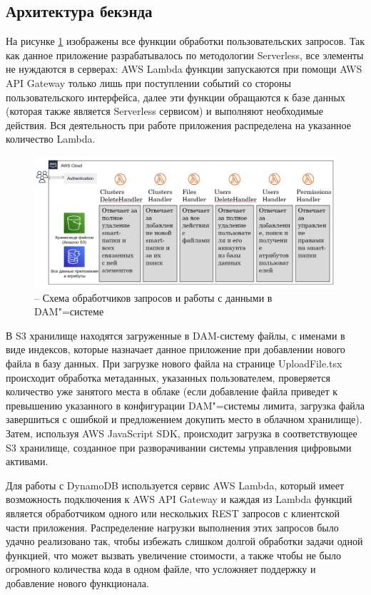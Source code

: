 \subsection{Архитектура бекэнда}
На рисунке \ref{backend} изображены все функции обработки пользовательских запросов. Так как данное приложение разрабатывалось по методологии Serverless, все элементы не нуждаются в серверах: AWS Lambda функции запускаются при помощи AWS API Gateway только лишь при поступлении событий со стороны пользовательского интерфейса, далее эти функции обращаются к базе данных (которая также является Serverless сервисом) и выполняют необходимые действия. Вся деятельность при работе приложения распределена на указанное количество Lambda.
\begin{figure}[H]
    \centering
    \includegraphics[scale=0.65]{images/BackEnd.png}
    \caption{-- Схема обработчиков запросов и работы с данными в DAM"=системе}
    \label{backend}
\end{figure}

В S3 хранилище находятся загруженные в DAM-систему файлы, с именами в виде индексов, которые назначает данное приложение при добавлении нового файла в базу данных. При загрузке нового файла на странице UploadFile.tsx происходит обработка метаданных, указанных пользователем, проверяется количество уже занятого места в облаке (если добавление файла приведет к превышению указанного в конфигурации DAM"=системы лимита, загрузка файла завершиться с ошибкой и предложением докупить место в облачном хранилище). Затем, используя AWS JavaScript SDK, происходит загрузка в соответствующее S3 хранилище, созданное при разворачивании системы управления цифровыми активами.

Для работы с DynamoDB используется сервис AWS Lambda, который имеет возможность подключения к AWS API Gateway и каждая из Lambda функций является обработчиком одного или нескольких REST запросов с клиентской части приложения. Распределение нагрузки выполнения этих запросов было удачно реализовано так, чтобы избежать слишком долгой обработки задачи одной функцией, что может вызвать увеличение стоимости, а также чтобы не было огромного количества кода в одном файле, что усложняет поддержку и добавление нового функционала.

